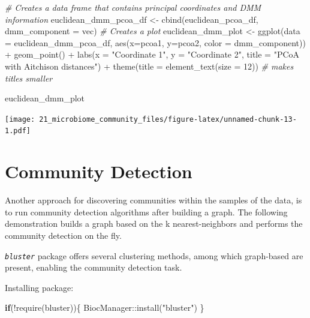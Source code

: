 \documentclass[
]{book}
\newenvironment{Shaded}{\begin{snugshade}}{\end{snugshade}}
\newcommand{\AttributeTok}[1]{\textcolor[rgb]{0.77,0.63,0.00}{#1}}
\newcommand{\CommentTok}[1]{\textcolor[rgb]{0.56,0.35,0.01}{\textit{#1}}}
\newcommand{\ControlFlowTok}[1]{\textcolor[rgb]{0.13,0.29,0.53}{\textbf{#1}}}
\newcommand{\DecValTok}[1]{\textcolor[rgb]{0.00,0.00,0.81}{#1}}
\newcommand{\FunctionTok}[1]{\textcolor[rgb]{0.00,0.00,0.00}{#1}}
\newcommand{\NormalTok}[1]{#1}
\newcommand{\OtherTok}[1]{\textcolor[rgb]{0.56,0.35,0.01}{#1}}
\newcommand{\SpecialCharTok}[1]{\textcolor[rgb]{0.00,0.00,0.00}{#1}}
\newcommand{\StringTok}[1]{\textcolor[rgb]{0.31,0.60,0.02}{#1}}
\begin{document}
\begin{Shaded}
\begin{Highlighting}[]
\CommentTok{\# Creates a data frame that contains principal coordinates and DMM information}
\NormalTok{euclidean\_dmm\_pcoa\_df }\OtherTok{\textless{}{-}} \FunctionTok{cbind}\NormalTok{(euclidean\_pcoa\_df,}
                               \AttributeTok{dmm\_component =}\NormalTok{ vec)}
\CommentTok{\# Creates a plot}
\NormalTok{euclidean\_dmm\_plot }\OtherTok{\textless{}{-}} \FunctionTok{ggplot}\NormalTok{(}\AttributeTok{data =}\NormalTok{ euclidean\_dmm\_pcoa\_df, }
                             \FunctionTok{aes}\NormalTok{(}\AttributeTok{x=}\NormalTok{pcoa1, }\AttributeTok{y=}\NormalTok{pcoa2,}
                                 \AttributeTok{color =}\NormalTok{ dmm\_component)) }\SpecialCharTok{+}
  \FunctionTok{geom\_point}\NormalTok{() }\SpecialCharTok{+}
  \FunctionTok{labs}\NormalTok{(}\AttributeTok{x =} \StringTok{"Coordinate 1"}\NormalTok{,}
       \AttributeTok{y =} \StringTok{"Coordinate 2"}\NormalTok{,}
       \AttributeTok{title =} \StringTok{"PCoA with Aitchison distances"}\NormalTok{) }\SpecialCharTok{+}  
  \FunctionTok{theme}\NormalTok{(}\AttributeTok{title =} \FunctionTok{element\_text}\NormalTok{(}\AttributeTok{size =} \DecValTok{12}\NormalTok{)) }\CommentTok{\# makes titles smaller}

\NormalTok{euclidean\_dmm\_plot}
\end{Highlighting}
\end{Shaded}

\texttt{[image: 21\_microbiome\_community\_files/figure-latex/unnamed-chunk-13-1.pdf]}

\hypertarget{community-detection}{%
\section{Community Detection}\label{community-detection}}

Another approach for discovering communities within the samples of the
data, is to run community detection algorithms after building a
graph. The following demonstration builds a graph based on the k
nearest-neighbors and performs the community detection on the fly.

\emph{\texttt{bluster}} \citep{R-bluster} package offers several clustering methods,
among which graph-based are present, enabling the community detection
task.

Installing package:

\begin{Shaded}
\begin{Highlighting}[]
\ControlFlowTok{if}\NormalTok{(}\SpecialCharTok{!}\FunctionTok{require}\NormalTok{(bluster))\{}
\NormalTok{  BiocManager}\SpecialCharTok{::}\FunctionTok{install}\NormalTok{(}\StringTok{"bluster"}\NormalTok{)}
\NormalTok{\}}
\end{Highlighting}
\end{Shaded}
\end{document}

